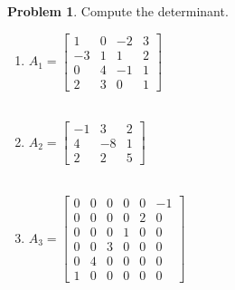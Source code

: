\documentclass[12pt, oneside]{amsart}
\theoremstyle{definition}
\newtheorem{prob}{Problem}
\begin{document}
\begin{prob} Compute the determinant.
\begin{enumerate}
    \item $A_1= \left[\begin{matrix}
        1 & 0 & -2 & 3 \\
        -3 & 1 & 1 & 2 \\
        0 & 4 & -1 & 1 \\
        2 & 3 & 0 & 1
    \end{matrix}\right]$\\\\
    
    \item $A_2= \left[\begin{matrix}
        -1 & 3 & 2 \\4 & -8 & 1 \\
        2 & 2 & 5
    \end{matrix}\right]$\\\\

    \item $A_3= \left[\begin{matrix}
        0 & 0 & 0 & 0 & 0 & -1 \\
        0 & 0 & 0 & 0 & 2 & 0 \\ 
        0 & 0 & 0 & 1 & 0 & 0 \\
        0 & 0 & 3 & 0 & 0 & 0 \\
        0 & 4 & 0 & 0 & 0 & 0 \\
        1 & 0 & 0 & 0 & 0 & 0 
    \end{matrix}\right]$
\end{enumerate}
\end{prob}
\end{document}
